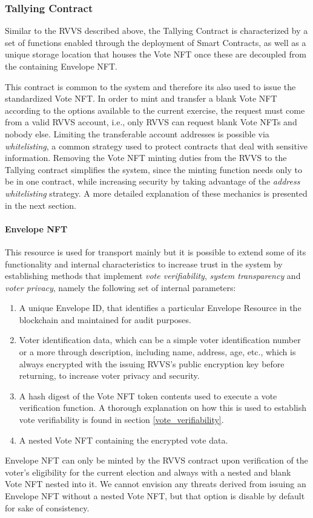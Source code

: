 \subsubsection{Tallying Contract}
Similar to the RVVS described above, the Tallying Contract is characterized by a set of functions enabled through the deployment of Smart Contracts, as well as a unique storage location that houses the Vote NFT once these are decoupled from the containing Envelope NFT.
\par
This contract is common to the system and therefore its also used to issue the standardized Vote NFT. In order to mint and transfer a blank Vote NFT according to the options available to the current exercise, the request must come from a valid RVVS account, i.e., only RVVS can request blank Vote NFTs and nobody else. Limiting the transferable account addresses is possible via \textit{whitelisting}, a common strategy used to protect contracts that deal with sensitive information. Removing the Vote NFT minting duties from the RVVS to the Tallying contract simplifies the system, since the minting function needs only to be in one contract, while increasing security by taking advantage of the \textit{address whitelisting} strategy.
A more detailed explanation of these mechanics is presented in the next section.

\paragraph{Envelope NFT}
This resource is used for transport mainly but it is possible to extend some of its functionality and internal characteristics to increase trust in the system by establishing methods that implement \textit{vote verifiability}, \textit{system transparency} and \textit{voter privacy}, namely the following set of internal parameters:
\begin{enumerate}
    \item {A unique Envelope ID}, that identifies a particular Envelope Resource in the blockchain and maintained for audit purposes.
    \item {Voter identification data}, which can be a simple voter identification number or a more through description, including name, address, age, etc., which is always encrypted with the issuing RVVS's public encryption key before returning, to increase voter privacy and security.
    \item {A hash digest of the Vote NFT token contents} used to execute a vote verification function. A thorough explanation on how this is used to establish vote verifiability is found in section \ref{vote_verifiability}.
    \item {A nested Vote NFT} containing the encrypted vote data.
\end{enumerate}
Envelope NFT can only be minted by the RVVS contract upon verification of the voter's eligibility for the current election and always with a nested and blank Vote NFT nested into it. We cannot envision any threats derived from issuing an Envelope NFT without a nested Vote NFT, but that option is disable by default for sake of consistency.

